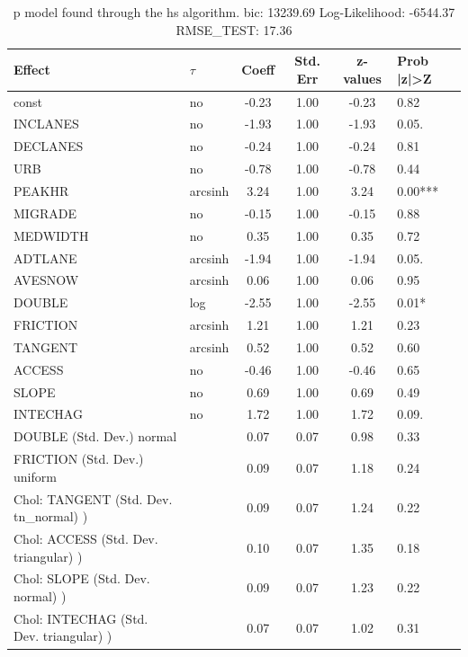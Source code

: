 \begin{table}
	\caption{p model found through the hs algorithm. bic: 13239.69 Log-Likelihood: -6544.37 RMSE_TEST: 17.36}
	\begin{center}
		\begin{tabular}{|l|l|c|c|c|l|}
			\hline
			Effect & $\tau$ & Coeff & Std. Err & z-values & Prob |z|>Z \\
			\hline
			const & no & -0.23 & 1.00 & -0.23 & 0.82 \\
			\hline
			INCLANES & no & -1.93 & 1.00 & -1.93 & 0.05. \\
			\hline
			DECLANES & no & -0.24 & 1.00 & -0.24 & 0.81 \\
			\hline
			URB & no & -0.78 & 1.00 & -0.78 & 0.44 \\
			\hline
			PEAKHR & arcsinh & 3.24 & 1.00 & 3.24 & 0.00*** \\
			\hline
			MIGRADE & no & -0.15 & 1.00 & -0.15 & 0.88 \\
			\hline
			MEDWIDTH & no & 0.35 & 1.00 & 0.35 & 0.72 \\
			\hline
			ADTLANE & arcsinh & -1.94 & 1.00 & -1.94 & 0.05. \\
			\hline
			AVESNOW & arcsinh & 0.06 & 1.00 & 0.06 & 0.95 \\
			\hline
			DOUBLE & log & -2.55 & 1.00 & -2.55 & 0.01* \\
			\hline
			FRICTION & arcsinh & 1.21 & 1.00 & 1.21 & 0.23 \\
			\hline
			TANGENT & arcsinh & 0.52 & 1.00 & 0.52 & 0.60 \\
			\hline
			ACCESS & no & -0.46 & 1.00 & -0.46 & 0.65 \\
			\hline
			SLOPE & no & 0.69 & 1.00 & 0.69 & 0.49 \\
			\hline
			INTECHAG & no & 1.72 & 1.00 & 1.72 & 0.09. \\
			\hline
			DOUBLE (Std. Dev.) normal &  & 0.07 & 0.07 & 0.98 & 0.33 \\
			\hline
			FRICTION (Std. Dev.) uniform &  & 0.09 & 0.07 & 1.18 & 0.24 \\
			\hline
			 Chol: TANGENT (Std. Dev. tn_normal) ) &  & 0.09 & 0.07 & 1.24 & 0.22 \\
			\hline
			 Chol: ACCESS (Std. Dev. triangular) ) &  & 0.10 & 0.07 & 1.35 & 0.18 \\
			\hline
			 Chol: SLOPE (Std. Dev. normal) ) &  & 0.09 & 0.07 & 1.23 & 0.22 \\
			\hline
			 Chol: INTECHAG (Std. Dev. triangular) ) &  & 0.07 & 0.07 & 1.02 & 0.31 \\

\end{tabular}
\end{center}
\end{table}
